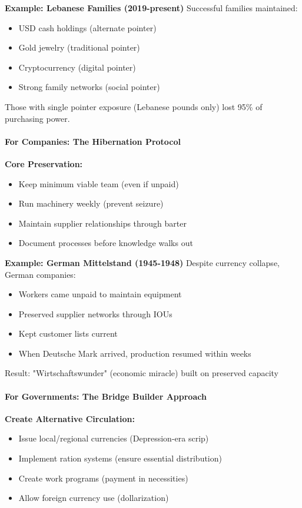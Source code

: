 \documentclass[11pt,oneside]{book}
\begin{document}
\textbf{Example: Lebanese Families (2019-present)}
Successful families maintained:
\begin{itemize}
\item USD cash holdings (alternate pointer)
\item Gold jewelry (traditional pointer)
\item Cryptocurrency (digital pointer)
\item Strong family networks (social pointer)
\end{itemize}
Those with single pointer exposure (Lebanese pounds only) lost 95\% of purchasing power.

\paragraph{For Companies: The Hibernation Protocol}

\textbf{Core Preservation:}
\begin{itemize}
\item Keep minimum viable team (even if unpaid)
\item Run machinery weekly (prevent seizure)
\item Maintain supplier relationships through barter
\item Document processes before knowledge walks out
\end{itemize}

\textbf{Example: German Mittelstand (1945-1948)}
Despite currency collapse, German companies:
\begin{itemize}
\item Workers came unpaid to maintain equipment
\item Preserved supplier networks through IOUs
\item Kept customer lists current
\item When Deutsche Mark arrived, production resumed within weeks
\end{itemize}
Result: "Wirtschaftswunder" (economic miracle) built on preserved capacity

\paragraph{For Governments: The Bridge Builder Approach}

\textbf{Create Alternative Circulation:}
\begin{itemize}
\item Issue local/regional currencies (Depression-era scrip)
\item Implement ration systems (ensure essential distribution)
\item Create work programs (payment in necessities)
\item Allow foreign currency use (dollarization)
\end{itemize}
\end{document}
